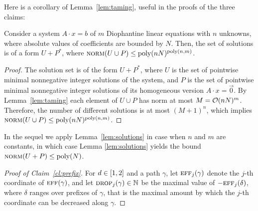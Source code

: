 \begin{appendixproof}
\medskip

Here is  a corollary of Lemma~\ref{lem:taming}, useful in the proofs of the three claims:
%
\begin{lemma}\label{lem:solutions}
Consider a system $A\cdot x = b$ of $m$ Diophantine linear equations with $n$ unknowns,
where absolute values of coefficients are bounded by $N$.
Then, the set of solutions is of a form $U+P^*$, where
$\textsc{norm}(U \cup P) \leq \textup{poly}(nN)^{\textup{poly}(n,m)}$.
\end{lemma}

\begin{proof}
The solution set is of the form $U+P^*$,
where $U$ is the set of pointwise minimal nonnegative integer solutions of the system,
and $P$ is the set of pointwise minimal nonnegative integer solutions of its homogeneous version
$A\cdot x = \vec 0$.
By Lemma~\ref{lem:taming} each element of $U \cup P$ has norm at most $M= \mathcal{O}(nN)^m$.
Therefore, the number of different solutions is at most $(M+1)^n$, which implies 
$\textsc{norm}(U \cup P) \leq \textup{poly}(nN)^{\textup{poly}(n,m)}$.
\end{proof}
%
In the sequel we apply Lemma~\ref{lem:solutions} in case when $n$ and $m$ are constants,
in which case Lemma \ref{lem:solutions} yields the bound $\textsc{norm}(U+P) \leq \textup{poly}(N)$.

\begin{proof}[Proof of Claim~\ref{cl:prefix}]
For $d \in [1, 2]$ and
a path $\gamma$, let $\textsc{eff}_j(\gamma)$ denote the $j$-th coordinate of $\textsc{eff}(\gamma)$, and
let $\textsc{drop}_j(\gamma)\in\mathbb{N}$ be the maximal value of $-\textsc{eff}_j(\delta)$, where $\delta$ ranges over prefixes of $\gamma$,
that is  the maximal amount by which the $j$-th coordinate can be decreased along $\gamma$.


\end{proof}
\end{appendixproof}
